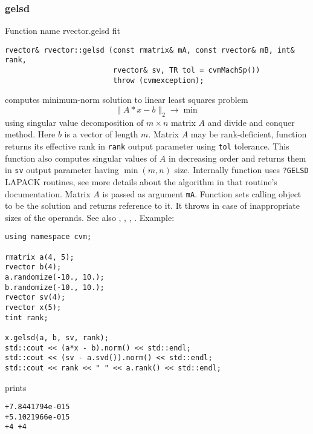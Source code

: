 \subsubsection{gelsd}
Function%
\pdfdest name {rvector.gelsd} fit
\begin{verbatim}
rvector& rvector::gelsd (const rmatrix& mA, const rvector& mB, int& rank,
                         rvector& sv, TR tol = cvmMachSp())
                         throw (cvmexception);
\end{verbatim}
computes minimum-norm solution to linear
least squares problem 
\begin{equation*}
\|A*x-b\|_2\to\min
\end{equation*}
using singular value decomposition of $m\times n$ matrix $A$
and divide and conquer method.
Here $b$ is a vector of length $m$.
Matrix $A$ may be rank-deficient, function returns 
its effective rank in \verb"rank"
output parameter using \verb"tol" tolerance.
This function also computes
singular values of $A$ in decreasing order and returns them in \verb"sv" output parameter
having $\min(m,n)$ size.
Internally function uses \verb"?GELSD" LAPACK routines, see more details
about the algorithm in that routine's documentation.
Matrix $A$ is passed as  argument \verb"mA".
Function sets calling object to be the solution and returns reference to it.
It throws
in case of inappropriate sizes of the operands.
See also , 
, ,
.
Example:
\begin{Verbatim}
using namespace cvm;

rmatrix a(4, 5);
rvector b(4);
a.randomize(-10., 10.);
b.randomize(-10., 10.);
rvector sv(4);
rvector x(5);
tint rank;

x.gelsd(a, b, sv, rank);
std::cout << (a*x - b).norm() << std::endl;
std::cout << (sv - a.svd()).norm() << std::endl;
std::cout << rank << " " << a.rank() << std::endl;
\end{Verbatim}
prints
\begin{Verbatim}
+7.8441794e-015
+5.1021966e-015
+4 +4
\end{Verbatim}
\newpage




